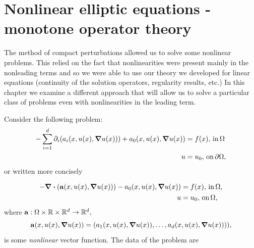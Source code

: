 \documentclass{article}
\begin{document}
\section{Nonlinear elliptic equations - monotone operator theory}
\label{sec:monotone_operator}

The method of compact perturbations allowed us to solve some nonlinear problems. This relied on the fact that nonlinearities were present mainly in the nonleading terms and so we were able to use our theory we developed for linear equations (continuity of the solution operators, regularity results, etc.) In this chapter we examine a different approach that will allow us to solve a particular class of problems even with nonlinearities in the leading term.

Consider the following problem:
\begin{align*}
	- \sum_{i=1}^d \partial_{i}\qty(a_i\qty(x,u(x),\grad u(x))) + a_0\qty(x,u(x),\grad u(x)) &= f(x), \, \text{in} \, \Omega \\
	u &= u_0,  \, \text{on} \, \partial \Omega,
\end{align*}
or written more concisely

\begin{align}
	\label{eq:nonlin_prob}
	- \divergence{\qty(\vb{a}\qty(x, u(x), \grad u(x)))} - a_0\qty(x, u(x), \grad u(x)) &= f(x), \, \text{in} \, \Omega, \\
	u &= u_0, \, \text{on} \, \Omega,
\end{align}
where $\vb{a}: \Omega \times {\mathbb R} \times {\mathbb R}^{d} \to {\mathbb R}^d,$
\[
	\vb{a}\qty(x, u(x), \grad u(x)) = \qty(a_1\qty(x, u(x), \grad u(x)), \dots, a_d\qty(x, u(x), \grad u(x)))),
\]
is some \textit{nonlinear} vector function. The data of the problem are
\end{document}
